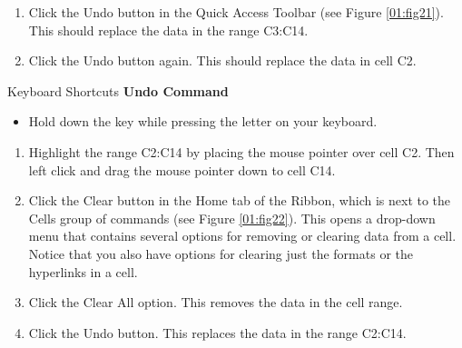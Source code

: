 \begin{enumerate}
	\item Click the Undo button in the Quick Access Toolbar (see Figure \ref{01:fig21}). This should replace the data in the range \textsf{C3:C14}.
	\item Click the Undo button again. This should replace the data in cell \textsf{C2}.
\end{enumerate}

\begin{center}
	\begin{shtcutbox}{Keyboard Shortcuts}
		\textbf{Undo Command}
		\\
		\begin{itemize}
			\setlength{\itemsep}{0pt}
			\setlength{\parskip}{0pt}
			\setlength{\parsep}{0pt}
			
			\item Hold down the  key while pressing the letter  on your keyboard.
			
		\end{itemize}
	\end{shtcutbox}
\end{center}

\begin{enumerate}[resume]
	\item Highlight the range \textsf{C2:C14} by placing the mouse pointer over cell \textsf{C2}. Then left click and drag the mouse pointer down to cell \textsf{C14}.
	\item Click the Clear button in the Home tab of the Ribbon, which is next to the Cells group of commands (see Figure \ref{01:fig22}). This opens a drop-down menu that contains several options for removing or clearing data from a cell. Notice that you also have options for clearing just the formats or the hyperlinks in a cell.
	\item Click the Clear All option. This removes the data in the cell range.
	\item Click the Undo button. This replaces the data in the range \textsf{C2:C14}.
\end{enumerate}

